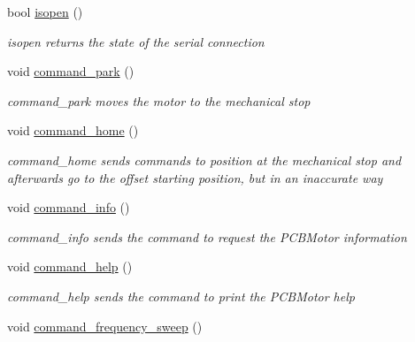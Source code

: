 \begin{DoxyCompactItemize}
bool \hyperlink{classMotor_a6522462ca0730300ca3335090425786b}{isopen} ()
\begin{DoxyCompactList}\small\item\em isopen returns the state of the serial connection \end{DoxyCompactList}\item 
\mbox{\label{classMotor_a1b3e37fc95517b98914ce3740232b098}} 
void \hyperlink{classMotor_a1b3e37fc95517b98914ce3740232b098}{command\+\_\+park} ()
\begin{DoxyCompactList}\small\item\em command\+\_\+park moves the motor to the mechanical stop \end{DoxyCompactList}\item 
\mbox{\label{classMotor_a75c8443fde45f5dc88e7bfe12db75a88}} 
void \hyperlink{classMotor_a75c8443fde45f5dc88e7bfe12db75a88}{command\+\_\+home} ()
\begin{DoxyCompactList}\small\item\em command\+\_\+home sends commands to position at the mechanical stop and afterwards go to the offset starting position, but in an inaccurate way \end{DoxyCompactList}\item 
\mbox{\label{classMotor_abae5d9c4f4e3e9b67a98ca2486edacb9}} 
void \hyperlink{classMotor_abae5d9c4f4e3e9b67a98ca2486edacb9}{command\+\_\+info} ()
\begin{DoxyCompactList}\small\item\em command\+\_\+info sends the command to request the P\+C\+B\+Motor information \end{DoxyCompactList}\item 
\mbox{\label{classMotor_aca8c344a7251cc4067f4d1cba69f7970}} 
void \hyperlink{classMotor_aca8c344a7251cc4067f4d1cba69f7970}{command\+\_\+help} ()
\begin{DoxyCompactList}\small\item\em command\+\_\+help sends the command to print the P\+C\+B\+Motor help \end{DoxyCompactList}\item 
\mbox{\label{classMotor_ade0bd3f46caadb9fef19f03629fc4e71}} 
void \hyperlink{classMotor_ade0bd3f46caadb9fef19f03629fc4e71}{command\+\_\+frequency\+\_\+sweep} ()

\end{DoxyCompactItemize}
